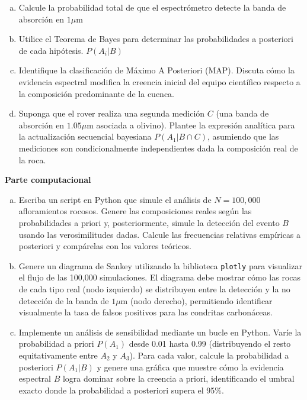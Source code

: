 \documentclass[a4paper]{article}
\begin{document}


\begin{enumerate}[a)]
\item Calcule la probabilidad total de que el espectrómetro detecte la banda de absorción en $1\mu$m
\item Utilice el Teorema de Bayes para determinar las probabilidades a posteriori de cada hipótesis.
$P(A_i|B)$
\item Identifique la clasificación de Máximo A Posteriori (MAP). Discuta cómo la evidencia espectral modifica la creencia inicial del equipo científico respecto a la composición predominante de la cuenca.
\item Suponga que el rover realiza una segunda medición $C$ (una banda de absorción en $1.05 \mu$m asociada a olivino). Plantee la expresión analítica para la actualización secuencial bayesiana $P(A_1|B \cap C)$, asumiendo que las mediciones son condicionalmente independientes dada la composición real de la roca.
\end{enumerate}

\textbf{Parte computacional}
\begin{enumerate}[a)]
\item Escriba un script en Python que simule el análisis de $N = 100,000$ afloramientos rocosos. Genere las composiciones reales según las probabilidades a priori y, posteriormente, simule la detección del evento $B$ usando las verosimilitudes dadas. Calcule las frecuencias relativas empíricas a posteriori y compárelas con los valores teóricos.
\item Genere un diagrama de Sankey utilizando la biblioteca \texttt{plotly} para visualizar el flujo de las 100,000 simulaciones. El diagrama debe mostrar cómo las rocas de cada tipo real (nodo izquierdo) se distribuyen entre la detección y la no detección de la banda de $1 \mu$m (nodo derecho), permitiendo identificar visualmente la tasa de falsos positivos para las condritas carbonáceas.
\item Implemente un análisis de sensibilidad mediante un bucle en Python. Varíe la probabilidad a priori $P(A_1)$ desde 0.01 hasta 0.99 (distribuyendo el resto equitativamente entre $A_2$ y $A_3$). Para cada valor, calcule la probabilidad a posteriori $P(A_1|B)$ y genere una gráfica que muestre cómo la evidencia espectral $B$ logra dominar sobre la creencia a priori, identificando el umbral exacto donde la probabilidad a posteriori supera el 95\%.
\end{enumerate}
\end{document}
